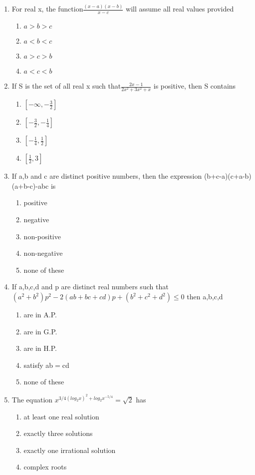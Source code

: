 \begin{enumerate}[label=\arabic*.,ref=\thesubsection.\theenumi]
\item For real x, the function$\frac{(x-a)(x-b)}{x-c}$ will assume all real values provided
\begin{enumerate}
\item $a>b>c$
\item $a<b<c$ 
\item $a>c>b$
\item $a<c<b$ 
\end{enumerate}

\item If S is the set of all real x such that$\frac{2x-1}{2x^{2}+3x^{2}+x}$ is positive, then S contains 
\begin{enumerate}
\item $[-\infty,-\frac{3}{2}]$
\item $[-\frac{3}{2},-\frac{1}{4}]$
\item $[-\frac{1}{4},\frac{1}{2}]$
\item $[\frac{1}{2},3]$
\end{enumerate}

\item If a,b and c are distinct positive numbers, then the expression (b+c-a)(c+a-b)(a+b-c)-abc is
\begin{enumerate}
\item positive
\item negative 
\item non-positive
\item non-negative
\item none of these 
\end{enumerate}

\item If a,b,c,d and p are distinct real numbers such that\\$(a^{2}+b^{2})p^{2}-2(ab+bc+cd)p+(b^{2}+c^{2}+d^{2})\leq0$ then a,b,c,d
\begin{enumerate}
\item are in A.P.
\item are in G.P. 
\item are in H.P.
\item satisfy ab$=$cd
\item none of these 
\end{enumerate}

\item The equation $x^{3/4(log_{2}x)^{2}+log_2x^{-5/4}}=\sqrt2$ has
\begin{enumerate}
\item at least one real solution
\item exactly three solutions
\item exactly one irrational solution
\item complex roots
\end{enumerate}


\end{enumerate}
